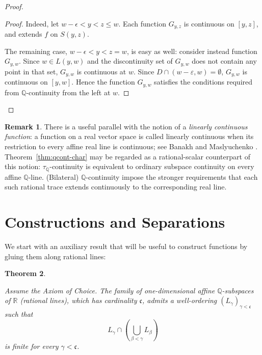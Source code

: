 \documentclass[11pt]{amsart} %
\newtheorem{theorem}{Theorem}[section]
\theoremstyle{definition}
\newtheorem{remark}[theorem]{Remark}
\newcommand{\R}{\mathbb{R}}
\newcommand{\Q}{\mathbb{Q}}
\begin{document}
\begin{proof}
\begin{proof}
Indeed, let
$w-\epsilon<y<z\leq w$. Each function $G_{y,z}$ is continuous on $[y, z]$, and 
extends $f$ on $S(y,z)$. 

The remaining case, $w-\epsilon<y<z=w$, is easy as well:  consider instead function $G_{y,w}$. Since $w\in L(y,w)$ and the discontinuity set of $G_{y,w}$ does not contain any point in that set, $G_{y,w}$ is continuous at $w$. Since $D\cap (w-\varepsilon,w)=\emptyset$, $G_{y,w}$ is continuous on $[y,w]$. Hence the function $G_{y,w}$ satisfies the conditions required from $\Q$-continuity from the left at $w$.  
\end{proof} 
\end{proof}

\begin{remark} 
There is a useful parallel with the notion of a \emph{linearly continuous function}:
a function on a real vector space is called linearly continuous when its restriction
to every affine real line is continuous; see Banakh and Maslyuchenko
\cite{45}.  Theorem~\ref{thm:qcont-char} may be regarded as a
rational-scalar counterpart of this notion: $\tau_{\mathbb Q}$-continuity is
equivalent to ordinary subspace continuity on every affine $\Q$-line.
(Bilateral) $\Q$-continuity impose the stronger requirements that each such
rational trace extends continuously to the corresponding real line.
\end{remark} 


\section{Constructions and Separations}
\label{sec:5} 

We start with an auxiliary result that will be useful to construct functions by gluing them along rational lines: 

\begin{theorem}
\label{well-ordering-lines}

Assume the Axiom of Choice. The family of one-dimensional affine \(\Q\)-subspaces of \(\R\) (rational lines), which has cardinality $\mathfrak{c}$, admits a well-ordering \((L_\gamma)_{\gamma<\mathfrak{c}}\) such that
\begin{equation} 
 L_\gamma\cap (\bigcup_{\beta<\gamma}L_\beta)
\end{equation} 
is finite for every \(\gamma<\mathfrak{c}\).
\end{theorem}
\end{document}
